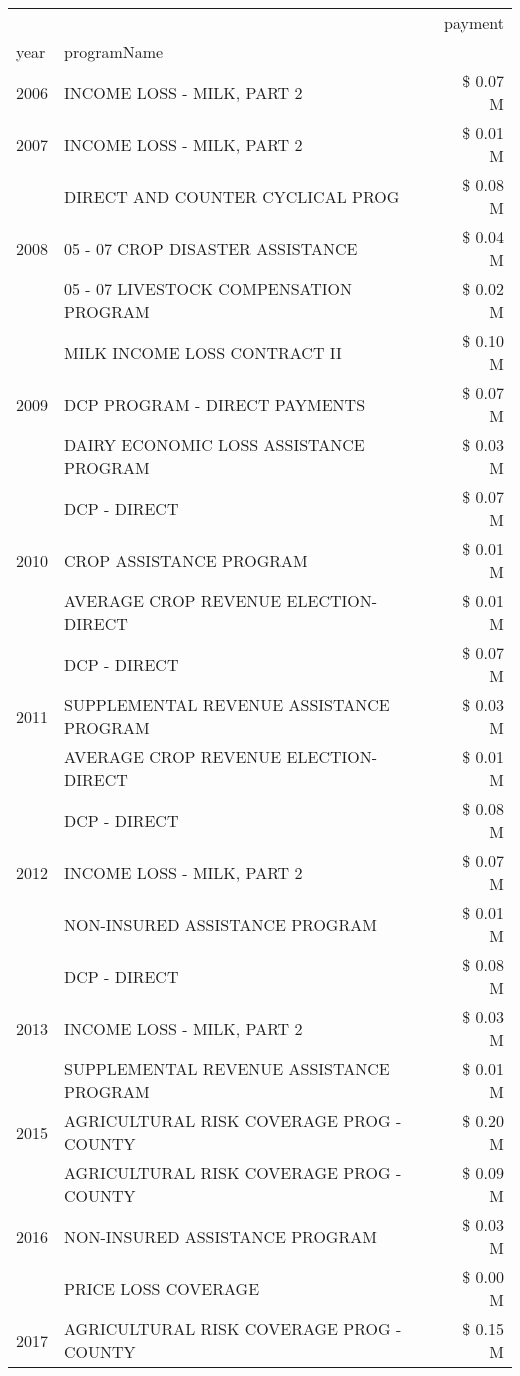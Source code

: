\begin{tabular}{llr}
\toprule
 &  & payment \\
year & programName &  \\
\midrule
2006 & INCOME LOSS - MILK, PART 2 & \$ 0.07 M \\
\cline{1-3}
2007 & INCOME LOSS - MILK, PART 2 & \$ 0.01 M \\
\cline{1-3}
\multirow[t]{3}{*}{2008} & DIRECT AND COUNTER CYCLICAL PROG & \$ 0.08 M \\
 & 05 - 07 CROP DISASTER ASSISTANCE & \$ 0.04 M \\
 & 05 - 07 LIVESTOCK COMPENSATION PROGRAM & \$ 0.02 M \\
\cline{1-3}
\multirow[t]{3}{*}{2009} & MILK INCOME LOSS CONTRACT II & \$ 0.10 M \\
 & DCP PROGRAM - DIRECT PAYMENTS & \$ 0.07 M \\
 & DAIRY ECONOMIC LOSS ASSISTANCE PROGRAM & \$ 0.03 M \\
\cline{1-3}
\multirow[t]{3}{*}{2010} & DCP - DIRECT & \$ 0.07 M \\
 & CROP ASSISTANCE PROGRAM & \$ 0.01 M \\
 & AVERAGE CROP REVENUE ELECTION-DIRECT & \$ 0.01 M \\
\cline{1-3}
\multirow[t]{3}{*}{2011} & DCP - DIRECT & \$ 0.07 M \\
 & SUPPLEMENTAL REVENUE ASSISTANCE PROGRAM & \$ 0.03 M \\
 & AVERAGE CROP REVENUE ELECTION-DIRECT & \$ 0.01 M \\
\cline{1-3}
\multirow[t]{3}{*}{2012} & DCP - DIRECT & \$ 0.08 M \\
 & INCOME LOSS - MILK, PART 2 & \$ 0.07 M \\
 & NON-INSURED ASSISTANCE PROGRAM & \$ 0.01 M \\
\cline{1-3}
\multirow[t]{3}{*}{2013} & DCP - DIRECT & \$ 0.08 M \\
 & INCOME LOSS - MILK, PART 2 & \$ 0.03 M \\
 & SUPPLEMENTAL REVENUE ASSISTANCE PROGRAM & \$ 0.01 M \\
\cline{1-3}
2015 & AGRICULTURAL RISK COVERAGE PROG - COUNTY & \$ 0.20 M \\
\cline{1-3}
\multirow[t]{3}{*}{2016} & AGRICULTURAL RISK COVERAGE PROG - COUNTY & \$ 0.09 M \\
 & NON-INSURED ASSISTANCE PROGRAM & \$ 0.03 M \\
 & PRICE LOSS COVERAGE & \$ 0.00 M \\
\cline{1-3}
\multirow[t]{3}{*}{2017} & AGRICULTURAL RISK COVERAGE PROG - COUNTY & \$ 0.15 M \\

\end{tabular}
